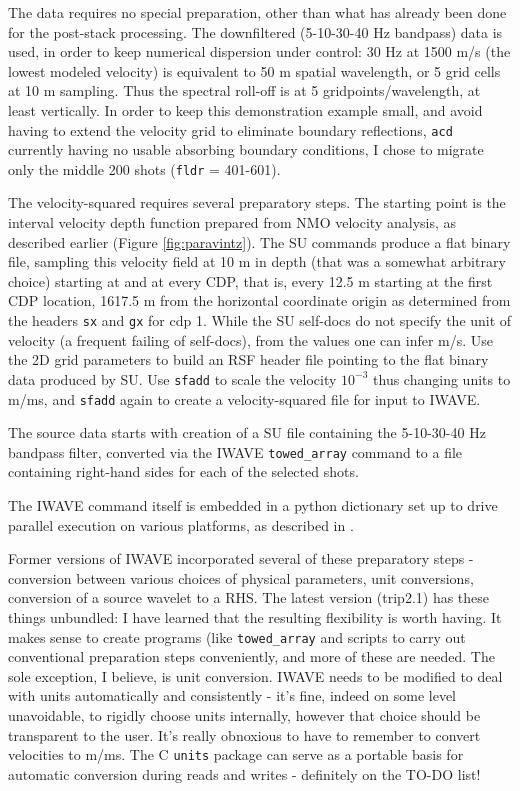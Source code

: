 The data requires no special preparation, other than what has already been done for the post-stack processing. The downfiltered (5-10-30-40 Hz bandpass) data is used, in order to keep numerical dispersion under control: 30 Hz at 1500 m/s (the lowest modeled velocity) is equivalent to 50 m spatial wavelength, or 5 grid cells at 10 m sampling. Thus the spectral roll-off is at 5 gridpoints/wavelength, at least vertically. In order to keep this demonstration example small, and avoid having to extend the velocity grid to eliminate boundary reflections, {\tt acd} currently having no usable absorbing boundary conditions, I chose to migrate only the middle 200 shots ({\tt fldr} = 401-601).

The velocity-squared requires several preparatory steps. The starting point is the interval velocity depth function prepared from NMO velocity analysis, as described earlier (Figure \ref{fig:paravintz}). The SU commands produce a flat binary file, sampling this velocity field at 10 m in depth (that was a somewhat arbitrary choice) starting at and at every CDP, that is, every 12.5 m starting at the first CDP location, 1617.5 m from the horizontal coordinate origin as determined from the headers {\tt sx} and {\tt gx} for cdp 1. While the SU self-docs do not specify the unit of velocity (a frequent failing of self-docs), from the values one can infer m/s. Use the 2D grid parameters to build an RSF header file pointing to the flat binary data produced by SU. Use {\tt sfadd} to scale the velocity $10^{-3}$ thus changing units to m/ms, and {\tt sfadd} again to create a velocity-squared file for input to IWAVE. 

The source data starts with creation of a SU file containing the 5-10-30-40 Hz bandpass filter, converted via the IWAVE {\tt towed\_array} command to a file containing right-hand sides for each of the selected shots.

The IWAVE command itself is embedded in a python dictionary set up to drive parallel execution on various platforms, as described in \cite{SymesIWPAR:15}. 

 Former versions of IWAVE incorporated several of these preparatory steps - conversion between various choices of physical parameters, unit conversions, conversion of a source wavelet to a RHS. The latest version (trip2.1) has these things unbundled: I have learned that the resulting flexibility is worth having. It makes sense to create programs (like {\tt towed\_array} and scripts to carry out conventional preparation steps conveniently, and more of these are needed. The sole exception, I believe, is unit conversion. IWAVE needs to be modified to deal with units automatically and consistently - it's fine, indeed on some level unavoidable, to rigidly choose units internally, however that choice should be transparent to the user. It's really obnoxious to have to remember to convert velocities to m/ms. The C {\tt units} package can serve as a portable basis for automatic conversion during reads and writes - definitely on the TO-DO list!

